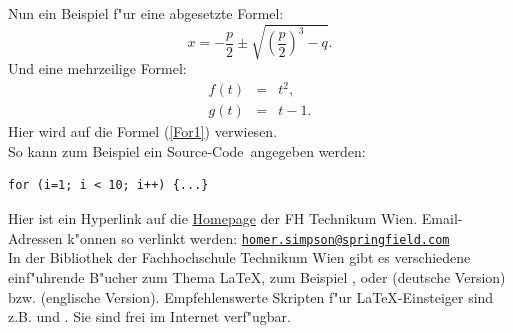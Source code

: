 \documentclass[a4paper,bibtotoc,oneside]{scrbook}
\begin{document}
\noindent
Nun ein Beispiel f"ur eine abgesetzte Formel:
\begin{equation}
x =  - \frac{p}{2} \pm \sqrt{\left(\frac{p}{2}\right)^3 - q}.
\end{equation}
Und eine mehrzeilige Formel:
\begin{eqnarray}
f(t)&=& t^2 \label{For1},\\
g(t) &=& t-1.
\end{eqnarray}
Hier wird auf die Formel (\ref{For1}) verwiesen. \\

\noindent
So kann zum Beispiel ein \glqq Source-Code\grqq\  angegeben werden: 
\begin{verbatim}
for (i=1; i < 10; i++) {...} 
\end{verbatim}

\noindent
Hier ist ein Hyperlink auf die  \href{http://www.technikum-wien.at}{Homepage} der FH Technikum Wien. Email-Adressen k"onnen so verlinkt werden: \href{mailto:homer.simpson@springfield.com}{\texttt{homer.simpson@springfield.com}}\\

\noindent
In der Bibliothek der Fachhochschule Technikum Wien gibt es verschiedene einf"uhrende B"ucher zum Thema \glqq \LaTeX \grqq, zum Beispiel \cite{kop05}, \cite{wil06} oder \cite{mgb+05d} (deutsche Version) bzw. \cite{mgb+04e} (englische Version). Empfehlenswerte Skripten f"ur \LaTeX-Einsteiger sind z.B. \cite{mj00} und \cite{mj95}. Sie sind frei im Internet verf"ugbar.





\end{document}
